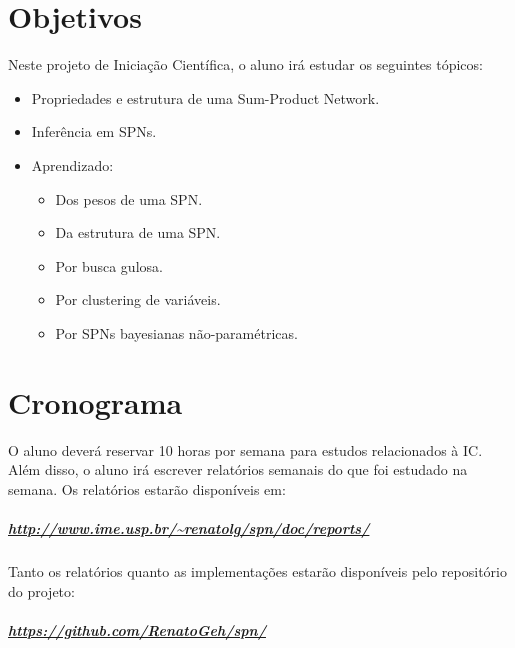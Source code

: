 \documentclass[a4paper,10pt]{article}
\theoremstyle{plain}
\begin{document}
\section{Objetivos}

Neste projeto de Iniciação Científica, o aluno irá estudar os seguintes tópicos:

\begin{itemize}
  \item Propriedades e estrutura de uma Sum-Product Network.
  \item Inferência em SPNs.
  \item Aprendizado:
  \begin{itemize}
    \item Dos pesos de uma SPN.\cite{poon-domingos}
    \item Da estrutura de uma SPN.\cite{gens-domingos}
    \item Por busca gulosa.\cite{greedy-search}
    \item Por clustering de variáveis.\cite{clustering}
    \item Por SPNs bayesianas não-paramétricas.\cite{non-parametric-bayesian}
  \end{itemize}
\end{itemize}

\section{Cronograma}

O aluno deverá reservar 10 horas por semana para estudos relacionados à IC. Além disso, o aluno
irá escrever relatórios semanais do que foi estudado na semana. Os relatórios estarão disponíveis
em:

\subparagraph{\url{http://www.ime.usp.br/~renatolg/spn/doc/reports/}}

Tanto os relatórios quanto as implementações estarão disponíveis pelo repositório do projeto:

\subparagraph{\url{https://github.com/RenatoGeh/spn/}}

\newpage

\printbibliography
\end{document}
